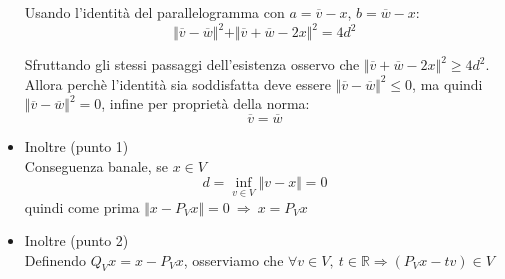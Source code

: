 \begin{dimostrazione}
\begin{itemize}
              Usando l'identità del parallelogramma con $a=\overline{v} -x$, $b=\overline{w} -x$:
              \begin{equation*}
                  \Vert \overline{v} -\overline{w}\Vert ^{2} +\Vert \overline{v} +\overline{w} -2x\Vert ^{2} =4d^{2}
              \end{equation*}

              Sfruttando gli stessi passaggi dell'esistenza osservo che $\Vert \overline{v} +\overline{w} -2x\Vert ^{2} \geq 4d^{2}$. Allora perchè l'identità sia soddisfatta deve essere $\Vert \overline{v} -\overline{w}\Vert ^{2} \leq 0$, ma quindi $\Vert \overline{v} -\overline{w}\Vert ^{2} =0$, infine per proprietà della norma:
              \begin{equation*}
                  \overline{v} =\overline{w}
              \end{equation*}
        \item Inoltre (punto 1)\\
              Conseguenza banale, se $x\in V$
              \begin{equation*}
                  d=\inf_{v\in V}\Vert v-x\Vert =0
              \end{equation*}
              quindi come prima $\Vert x-P_{V} x\Vert =0\ \Rightarrow \ x=P_{V} x$
        \item Inoltre (punto 2)\\
              Definendo $Q_{V} x=x-P_{V} x$, osserviamo che $\forall v\in V,\ t\in \mathbb{R} \Longrightarrow (P_{V} x-tv) \in V$




              \begin{figure}[H]
                  \centering


                  \begin{tikzpicture}[x=0.75pt,y=0.75pt,yscale=-1,xscale=1]


\end{tikzpicture}
\end{figure}
\end{itemize}
\end{dimostrazione}

